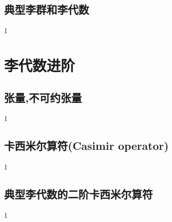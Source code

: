 \subsection{典型李群和李代数}
1
\section{李代数进阶}
\subsection{张量,不可约张量}
1
\subsection{卡西米尔算符(Casimir operator)}
1
\subsection{典型李代数的二阶卡西米尔算符}
1


